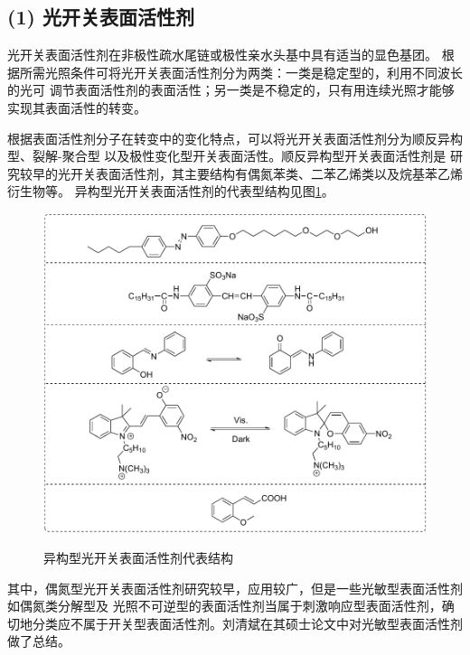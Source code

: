 \documentclass[bachelor,fandolfonts,replaceperiod]{jnuthesis}
\begin{document}
    \subsection*{(1) 光开关表面活性剂}
    光开关表面活性剂在非极性疏水尾链或极性亲水头基中具有适当的显色基团\cite{张冤帝2017}。
    根据所需光照条件可将光开关表面活性剂分为两类：一类是稳定型的，利用不同波长的光可
    调节表面活性剂的表面活性；另一类是不稳定的，只有用连续光照才能够实现其表面活性的转变。
    
    根据表面活性剂分子在转变中的变化特点，可以将光开关表面活性剂分为顺反异构型、裂解-聚合型
    以及极性变化型开关表面活性\cite{张冤帝2017,李云霞2011}。顺反异构型开关表面活性剂是
    研究较早的光开关表面活性剂，其主要结构有偶氮苯类、二苯乙烯类以及烷基苯乙烯衍生物等。
    异构型光开关表面活性剂的代表型结构见图\ref{fig:switchable-light}\cite{张冤帝2017,karthaus1996,shang2003,吕湘亮2018}。
    
    \begin{figure}[htbp]
        \centering
        \includegraphics[scale=0.8]{Figure/switchable-light.pdf}\\
        \caption{异构型光开关表面活性剂代表结构\cite{张冤帝2017,karthaus1996,shang2003,吕湘亮2018}}\label{fig:switchable-light}
    \end{figure}
    
    其中，偶氮型光开关表面活性剂研究较早，应用较广，但是一些光敏型表面活性剂\cite{刘清斌2018}如偶氮类分解型及
    光照不可逆型的表面活性剂当属于刺激响应型表面活性剂，确切地分类应不属于开关型表面活性剂。刘清斌在其硕士论文中对光敏型表面活性剂做了总结。
    
\end{document}
